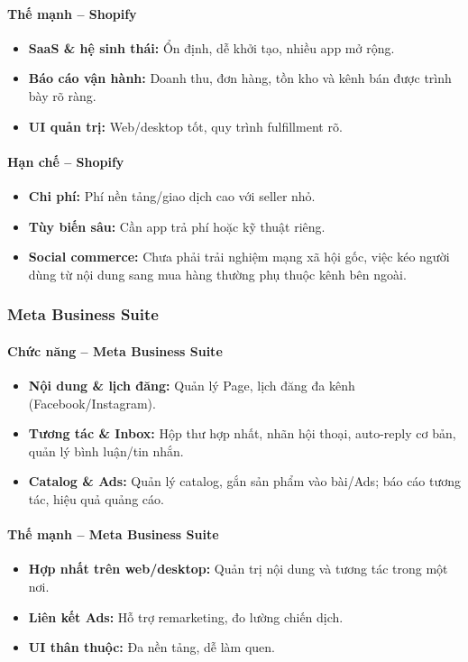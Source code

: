 \paragraph{Thế mạnh – Shopify}
\begin{itemize}
    \item \textbf{SaaS \& hệ sinh thái:} Ổn định, dễ khởi tạo, nhiều app mở rộng.
    \item \textbf{Báo cáo vận hành:} Doanh thu, đơn hàng, tồn kho và kênh bán được trình bày rõ ràng.
    \item \textbf{UI quản trị:} Web/desktop tốt, quy trình fulfillment rõ.
\end{itemize}

\paragraph{Hạn chế – Shopify}
\begin{itemize}
    \item \textbf{Chi phí:} Phí nền tảng/giao dịch cao với seller nhỏ.
    \item \textbf{Tùy biến sâu:} Cần app trả phí hoặc kỹ thuật riêng.
    \item \textbf{Social commerce:} Chưa phải trải nghiệm mạng xã hội gốc, việc kéo người dùng từ nội dung sang mua hàng thường phụ thuộc kênh bên ngoài.
\end{itemize}

\subsubsection{Meta Business Suite}
\paragraph{Chức năng – Meta Business Suite}
\begin{itemize}
    \item \textbf{Nội dung \& lịch đăng:} Quản lý Page, lịch đăng đa kênh (Facebook/Instagram).
    \item \textbf{Tương tác \& Inbox:} Hộp thư hợp nhất, nhãn hội thoại, auto-reply cơ bản, quản lý bình luận/tin nhắn.
    \item \textbf{Catalog \& Ads:} Quản lý catalog, gắn sản phẩm vào bài/Ads; báo cáo tương tác, hiệu quả quảng cáo.
\end{itemize}

\paragraph{Thế mạnh – Meta Business Suite}
\begin{itemize}
    \item \textbf{Hợp nhất trên web/desktop:} Quản trị nội dung và tương tác trong một nơi.
    \item \textbf{Liên kết Ads:} Hỗ trợ remarketing, đo lường chiến dịch.
    \item \textbf{UI thân thuộc:} Đa nền tảng, dễ làm quen.
\end{itemize}

